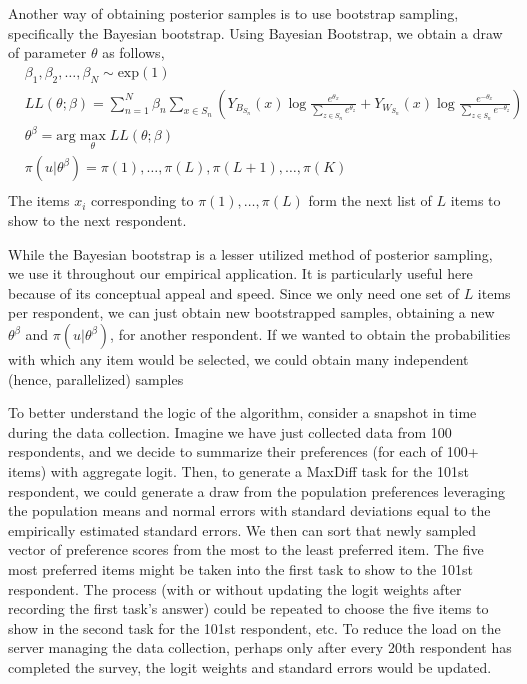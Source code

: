 \documentclass[a4paper,12pt]{article}
\newcommand{\numperset}{L}
\begin{document}
Another way of obtaining posterior samples is to use bootstrap sampling, specifically the Bayesian bootstrap. Using Bayesian Bootstrap, we obtain a draw of parameter $\theta$ as follows,
\begin{align*}
&\beta_1,\beta_2,\ldots,\beta_N \sim \text{exp}(1)\\
&LL(\theta;\beta)=\sum_{n=1}^N \beta_n
\sum_{x \in S_n} 
	\left(
		Y_{B_{S_n}}(x)
		\log{\frac{e^{\theta_x}}{\sum_{z\in S_n} e^{\theta_z}}} 
		+ 
		Y_{W_{S_n}}(x)
		\log{\frac{e^{-\theta_x}}{\sum_{z\in S_n} e^{-\theta_z}}}
	\right) \\
&\theta^\beta = \text{arg}\max_{\theta} LL(\theta;\beta) \\
&\pi(u|\theta^\beta) = \pi(1),\ldots,\pi(L),\pi(L+1),\ldots,\pi(K)\\
\end{align*}
The items $x_i$ corresponding to $\pi(1),\ldots,\pi(L)$ form the next list of $\numperset$ items to show to the next respondent. 

While the Bayesian bootstrap is a lesser utilized method of posterior sampling, we use it throughout our empirical application. It is particularly useful here because of its conceptual appeal and speed. Since we only need one set of $\numperset$ items per respondent, we can just obtain new bootstrapped samples, obtaining a new $\theta^{\beta}$ and $\pi(u|\theta^\beta)$, for another respondent. If we wanted to obtain the probabilities with which any item would be selected, we could obtain many independent (hence, parallelized) samples


To better understand the logic of the algorithm, consider a snapshot in time during the data collection. Imagine we have just collected data from 100 respondents, and we decide to summarize their preferences (for each of 100+ items) with aggregate logit.  Then, to generate a MaxDiff task for the 101st respondent, we could generate a draw from the population preferences leveraging the population means and normal errors with standard deviations equal to the empirically estimated standard errors.  We then can sort that newly sampled vector of preference scores from the most to the least preferred item.  The five most preferred items might be taken into the first task to show to the 101st respondent.  The process (with or without updating the logit weights after recording the first task's answer) could be repeated to choose the five items to show in the second task for the 101st respondent, etc.  To reduce the load on the server managing the data collection, perhaps only after every 20th respondent has completed the survey, the logit weights and standard errors would be updated.
\end{document}
